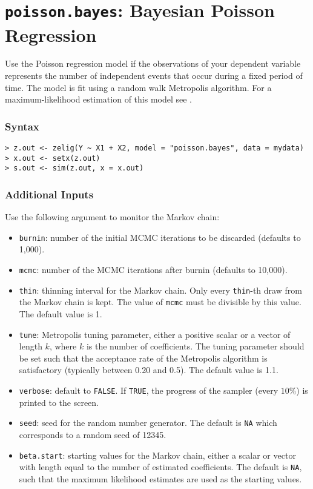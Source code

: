 \section{\texttt{poisson.bayes}: Bayesian Poisson Regression}

\label{poisson.bayes}

Use the Poisson regression model if the observations of your dependent
variable represents the number of independent events that occur during
a fixed period of time. The model is fit using a random walk
Metropolis algorithm.  For a maximum-likelihood estimation of this
model see .

\subsubsection{Syntax}
\begin{verbatim}
> z.out <- zelig(Y ~ X1 + X2, model = "poisson.bayes", data = mydata)
> x.out <- setx(z.out)
> s.out <- sim(z.out, x = x.out)
\end{verbatim}

\subsubsection{Additional Inputs}

Use the following argument to monitor the Markov chain:  
\begin{itemize}
\item \texttt{burnin}: number of the initial MCMC iterations to be 
 discarded (defaults to 1,000). 

\item \texttt{mcmc}: number of the MCMC iterations after burnin
(defaults to 10,000).

\item \texttt{thin}:  thinning interval for the Markov chain. Only every 
 \texttt{thin}-th draw from the Markov chain is kept. The value of 
\texttt{mcmc} must be divisible by this value. The default value is 1.

\item \texttt{tune}: Metropolis tuning parameter, either 
a positive scalar or a vector of length $k$, where $k$ is the number
of coefficients. The tuning parameter should be set such that the
acceptance rate of the Metropolis algorithm is satisfactory (typically
between 0.20 and 0.5). The default value is 1.1.

\item \texttt{verbose}: default to {\tt FALSE}. 
If \texttt{TRUE}, the progress of the sampler (every $10\%$) is
printed to the screen.

\item \texttt{seed}: seed for the random number generator. The default 
is \texttt{NA} which corresponds to a random seed of 12345. 

\item \texttt{beta.start}: starting values for the Markov 
chain, either a scalar or vector with length equal to the number of
estimated coefficients. The default is \texttt{NA}, such that the
maximum likelihood estimates are used as the starting values.

\end{itemize}


